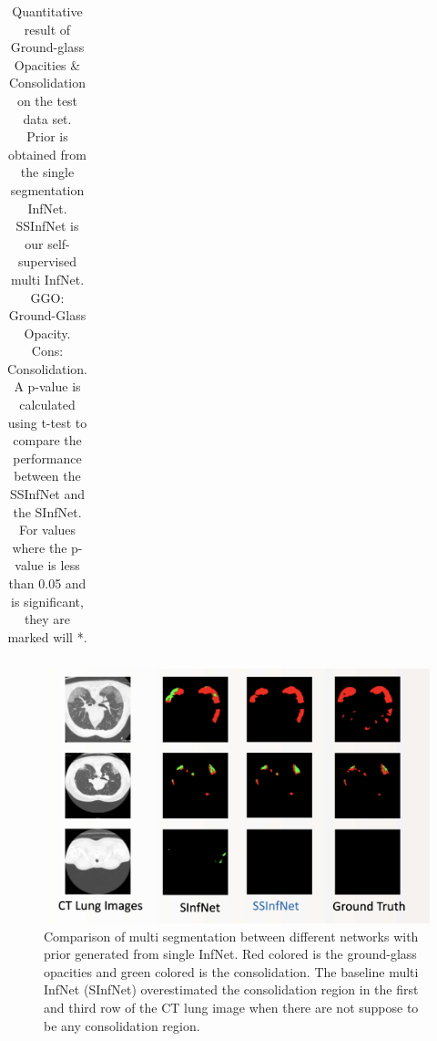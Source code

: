 \begin{table}[!h]
\begin{tabular}{ |c|c|c|c|c|c|c|c| }
	\end{tabular}
\caption{Quantitative result of Ground-glass Opacities \& Consolidation on the test data set. Prior is obtained from the single segmentation InfNet. SSInfNet is our self-supervised multi InfNet. GGO: Ground-Glass Opacity. Cons: Consolidation. A p-value is calculated using t-test to compare the performance between the SSInfNet and the SInfNet. For values where the p-value is less than 0.05 and is significant, they are marked will *. }
\label{tab:multi-weakprior}
\end{table}


  \begin{figure}
 	\includegraphics[width=\linewidth]{comparison_multi_weakprior.png}
 	\caption{Comparison of multi segmentation between different networks with prior generated from single InfNet. Red colored is the ground-glass opacities and green colored is the consolidation. The baseline multi InfNet (SInfNet) overestimated the consolidation region in the first and third row of the CT lung image when there are not suppose to be any consolidation region.}
 	\label{fig:multi-weakprior-comparison}
 \end{figure}
